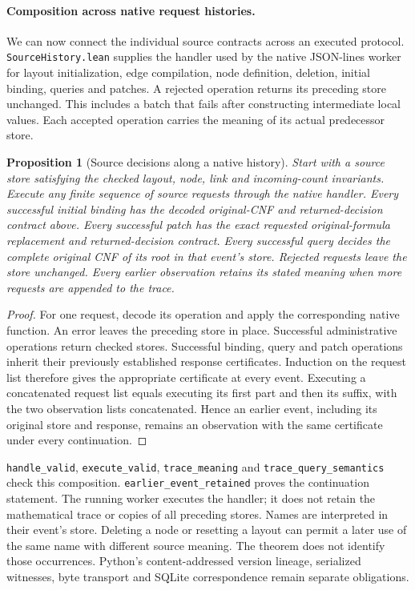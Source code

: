 \documentclass[11pt,a4paper]{article}
\numberwithin{equation}{section}
\theoremstyle{plain}
\newtheorem{proposition}[lemma]{Proposition}
\theoremstyle{definition}
\theoremstyle{remark}
\begin{document}
\paragraph{Composition across native request histories.}
We can now connect the individual source contracts across an executed protocol. \texttt{SourceHistory.lean} supplies the handler used by the native JSON-lines worker for layout initialization, edge compilation, node definition, deletion, initial binding, queries and patches. A rejected operation returns its preceding store unchanged. This includes a batch that fails after constructing intermediate local values. Each accepted operation carries the meaning of its actual predecessor store.

\begin{proposition}[Source decisions along a native history]
\label{prop:source-history}
Start with a source store satisfying the checked layout, node, link and incoming-count invariants. Execute any finite sequence of source requests through the native handler. Every successful initial binding has the decoded original-CNF and returned-decision contract above. Every successful patch has the exact requested original-formula replacement and returned-decision contract. Every successful query decides the complete original CNF of its root in that event's store. Rejected requests leave the store unchanged. Every earlier observation retains its stated meaning when more requests are appended to the trace.
\end{proposition}

\begin{proof}
For one request, decode its operation and apply the corresponding native function. An error leaves the preceding store in place. Successful administrative operations return checked stores. Successful binding, query and patch operations inherit their previously established response certificates. Induction on the request list therefore gives the appropriate certificate at every event. Executing a concatenated request list equals executing its first part and then its suffix, with the two observation lists concatenated. Hence an earlier event, including its original store and response, remains an observation with the same certificate under every continuation.
\end{proof}

\texttt{handle\_valid}, \texttt{execute\_valid}, \texttt{trace\_meaning} and \texttt{trace\_query\_semantics} check this composition. \texttt{earlier\_event\_retained} proves the continuation statement. The running worker executes the handler; it does not retain the mathematical trace or copies of all preceding stores. Names are interpreted in their event's store. Deleting a node or resetting a layout can permit a later use of the same name with different source meaning. The theorem does not identify those occurrences. Python's content-addressed version lineage, serialized witnesses, byte transport and SQLite correspondence remain separate obligations.
\end{document}
